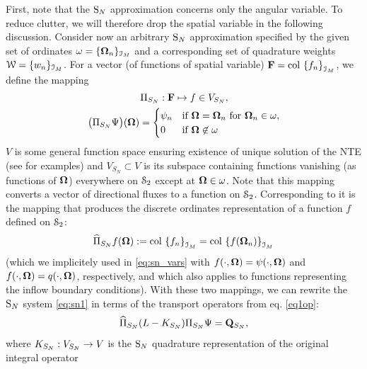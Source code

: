 First, note that the $\text{S}_{N}$ approximation concerns only the angular variable. To reduce clutter, we will therefore drop
the spatial variable in the following discussion.
Consider now an arbitrary $\text{S}_{N}$ approximation specified by the given set of ordinates
$\omega = \{\mathbf{\Omega}_n\}_{\mathcal{I}_{M}}$ and a corresponding set of quadrature weights $\mathcal{W} =
\{w_n\}_{\mathcal{I}_{M}}$.
For a vector (of functions of spatial variable) $\mathbf{F} = \operatorname{col\,}\left\{f_n\right\}_{\mathcal{I}_{M}}$, we define the mapping
\begin{equation}\label{eq:map_SN}
\begin{gathered}
\Pi_{S_N}: \mathbf{F} \mapsto f\in V_{S_N},\\
\bigl(\Pi_{S_N} \Psi\bigr)(\mathbf{\Omega}) = 
\begin{cases}\displaystyle \psi_n & \mbox{if $\mathbf{\Omega} = \mathbf{\Omega}_n$ for $\mathbf{\Omega}_n \in \omega$},\\ 0 & \mbox{if $\mathbf{\Omega} \not
	\in \omega$} \end{cases}
\end{gathered}
\end{equation}
$V$ is some general function space ensuring existence of unique solution of the NTE (see  for
examples) and $V_{S_N}\subset V$ is its subspace containing functions vanishing (as functions of $\mathbf{\Omega}$) everywhere
on $\mathcal{S}_2$ except at $\mathbf{\Omega} \in \omega$. Note that this mapping converts a vector of directional fluxes to a 
function on $\mathcal{S}_2$. Corresponding to it is the mapping that produces the discrete ordinates representation of a 
function $f$ defined on $\mathcal{S}_2$:
\begin{equation}\label{eq:map_SN_inv}
	\widehat\Pi_{S_N} f(\mathbf{\Omega}) := \operatorname{col\,}\left\{f_n \right\}_{\mathcal{I}_{M}}
	 = \operatorname{col\,}\left\{f(\mathbf{\Omega}_n)\right\}_{\mathcal{I}_{M}}
\end{equation}
(which we implicitely used in \eqref{eq:sn_vars} with $f(\cdot,\mathbf{\Omega}) = \psi(\cdot,\mathbf{\Omega})$ and
$f(\cdot,\mathbf{\Omega}) = q(\cdot,\mathbf{\Omega})$, respectively, and which also applies to functions representing the
inflow boundary conditions).
With these two mappings, we can rewrite the $\text{S}_{N}$ system \eqref{eq:sn1} in terms of the transport operators from eq.
\eqref{eq1op}:
\begin{equation}\label{eq:sn_op}
	\widehat\Pi_{S_N} (L - K_{S_N}) \Pi_{S_N} \Psi = \mathbf{Q}_{S_N},
\end{equation}
where $K_{S_N}: V_{S_N} \to V$ is the $\text{S}_{N}$ quadrature representation of the original integral operator
